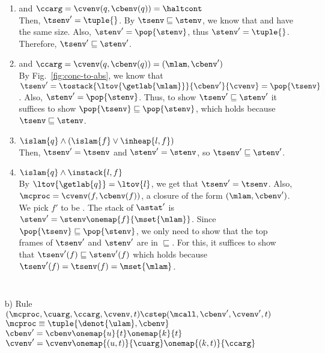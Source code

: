 \documentclass{LMCS}
\theoremstyle{definition} \newtheorem{property}[thm]{Property}
\begin{document}
\begin{enumerate}[$\bullet$]
    \begin{enumerate}[$\bullet$]
    \item 
       and $\ccarg = \cvenv(q, \cbenv(q)) = \haltcont$ \\
      Then, $\tsenv' = \tuple{}$.
      By $\tsenv \sqsubseteq \stenv$, we know that \tsenv{} and \stenv{} have
      the same size.
      Also, $\stenv' = \pop{\stenv}$, thus $\stenv' = \tuple{}$.
      Therefore, $\tsenv' \sqsubseteq \stenv'$.
    \item
       and $\ccarg = \cvenv(q, \cbenv(q)) = (\mlam, \cbenv')$ \\
      By Fig.~\ref{fig:conc-to-abs}, we know that $\tsenv' = 
      \tostack{\ltov{\getlab{\mlam}}}{\cbenv'}{\cvenv} = \pop{\tsenv}$.
      Also, $\stenv' = \pop{\stenv}$.
      Thus, to show $\tsenv' \sqsubseteq \stenv'$ it suffices to show
      $\pop{\tsenv} \sqsubseteq \pop{\stenv}$, which holds because
      $\tsenv \sqsubseteq \stenv$.
    \item
      $\islam{q} \land (\islam{f} \lor \inheap{l, f})$ \\
      Then, $\tsenv' = \tsenv$ and $\stenv' = \stenv$, so $\tsenv' \sqsubseteq 
      \stenv'$.
    \item
      $\islam{q} \land \instack{l, f}$ \\
      By $\ltov{\getlab{q}} = \ltov{l}$, we get that $\tsenv' = \tsenv$.
      Also, $\mcproc = \cvenv(f, \cbenv(f))$, a closure of the form 
      $(\mlam, \cbenv')$.
      We pick $f'$ to be \mlam.
      The stack of $\astat'$ is $\stenv' = \stenv\onemap{f}{\mset{\mlam}}$.
      Since $\pop{\tsenv} \sqsubseteq \pop{\stenv}$, we only need to show that
      the top frames of $\tsenv'$ and $\stenv'$ are in $\sqsubseteq$.
      For this, it suffices to show that $\tsenv'(f) \sqsubseteq \stenv'(f)$
      which holds because $\tsenv'(f) = \tsenv(f) = \mset{\mlam}$.
    \end{enumerate}
  $\phantom{want some space between cases a) and b) }$
\item[b)]
    Rule  \\
    $(\mcproc, \cuarg, \ccarg, \cvenv, t) \cstep (\mcall, \cbenv', \cvenv', t)$
    \\
    $\mcproc \equiv \tuple{\denot{\ulam}, \cbenv}$\\
    $\cbenv' = \cbenv \onemap{u}{t} \onemap{k}{t}$ \\
    $\cvenv' = \cvenv \onemap{(u, t)}{\cuarg} \onemap{(k, t)}{\ccarg}$  \\
    \\

\end{enumerate}
\end{document}
